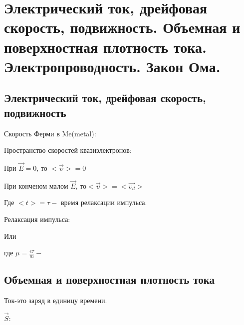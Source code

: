\section{Электрический ток, дрейфовая скорость, подвижность. Объемная и
поверхностная плотность тока. Электропроводность. Закон Ома.}

\subsection*{Электрический ток, дрейфовая скорость, подвижность}

Скорость Ферми в Me(metal):



Пространство скоростей квазиэлектронов:


При $\vec{E}=0\text{, то }<\vec{\upsilon}>=0$

При конченом малом $\vec{E}\text{, то} <\vec{\upsilon}>=<\vec{\upsilon_d}>$



Где $<t>=\tau-$ время релаксации импульса.

Релаксация импульса:

Или


где $\mu=\frac{e\tau }{m}-$

\newpage

\subsection*{Объемная и поверхностная плотность тока}

Ток-это заряд в единицу времени.

 


 $\vec{S}:$

